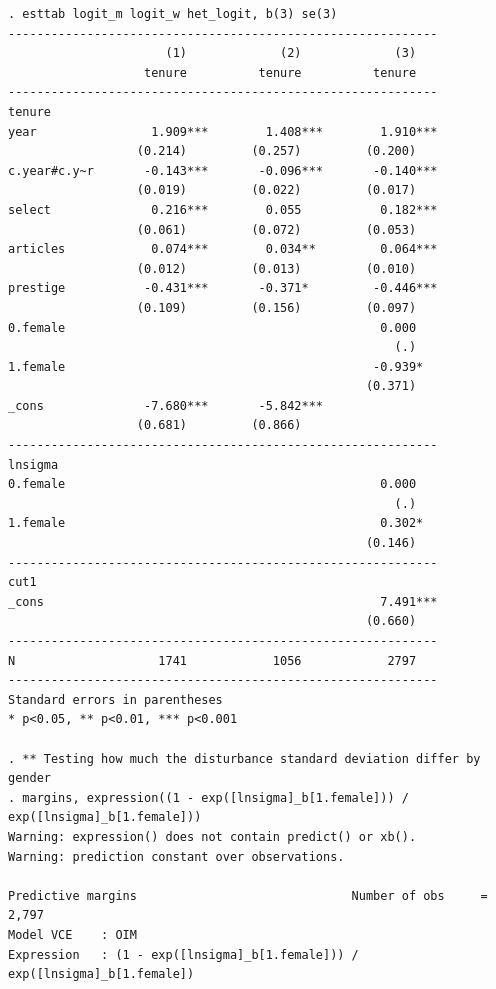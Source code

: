\begin{verbatim}
. esttab logit_m logit_w het_logit, b(3) se(3)
------------------------------------------------------------
                      (1)             (2)             (3)   
                   tenure          tenure          tenure   
------------------------------------------------------------
tenure                                                      
year                1.909***        1.408***        1.910***
                  (0.214)         (0.257)         (0.200)   
c.year#c.y~r       -0.143***       -0.096***       -0.140***
                  (0.019)         (0.022)         (0.017)   
select              0.216***        0.055           0.182***
                  (0.061)         (0.072)         (0.053)   
articles            0.074***        0.034**         0.064***
                  (0.012)         (0.013)         (0.010)   
prestige           -0.431***       -0.371*         -0.446***
                  (0.109)         (0.156)         (0.097)   
0.female                                            0.000   
                                                      (.)   
1.female                                           -0.939*  
                                                  (0.371)   
_cons              -7.680***       -5.842***                
                  (0.681)         (0.866)                   
------------------------------------------------------------
lnsigma                                                     
0.female                                            0.000   
                                                      (.)   
1.female                                            0.302*  
                                                  (0.146)   
------------------------------------------------------------
cut1                                                        
_cons                                               7.491***
                                                  (0.660)   
------------------------------------------------------------
N                    1741            1056            2797   
------------------------------------------------------------
Standard errors in parentheses
* p<0.05, ** p<0.01, *** p<0.001

. ** Testing how much the disturbance standard deviation differ by gender
. margins, expression((1 - exp([lnsigma]_b[1.female])) / exp([lnsigma]_b[1.female]))
Warning: expression() does not contain predict() or xb().
Warning: prediction constant over observations.

Predictive margins                              Number of obs     =      2,797
Model VCE    : OIM
Expression   : (1 - exp([lnsigma]_b[1.female])) / exp([lnsigma]_b[1.female])


\end{verbatim}
